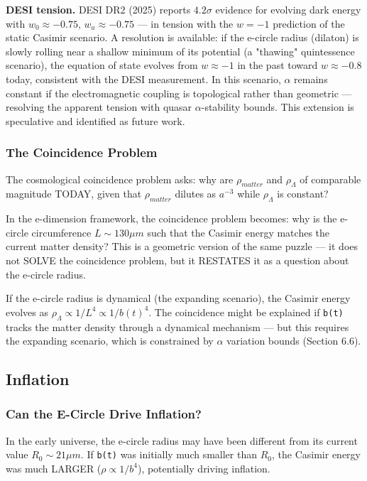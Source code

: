 \documentclass[aps,prd,preprint,superscriptaddress,longbibliography,floatfix]{revtex4-2}
\theoremstyle{remark}
\begin{document}
\textbf{DESI tension.} DESI DR2 (2025) reports $4.2\sigma$ evidence for evolving dark energy with $w_{0} \approx -0.75$, $w_a \approx -0.75$ --- in tension with the $w = -1$ prediction of the static Casimir scenario. A resolution is available: if the e-circle radius (dilaton) is slowly rolling near a shallow minimum of its potential (a "thawing" quintessence scenario), the equation of state evolves from $w \approx -1$ in the past toward $w \approx -0.8$ today, consistent with the DESI measurement. In this scenario, $\alpha$ remains constant if the electromagnetic coupling is topological rather than geometric --- resolving the apparent tension with quasar $\alpha$-stability bounds. This extension is speculative and identified as future work.


\subsubsection{The Coincidence Problem}

The cosmological coincidence problem asks: why are $\rho_{matter}$ and $\rho_\Lambda$ of comparable magnitude TODAY, given that $\rho_{matter}$ dilutes as $a^{-3}$ while $\rho_\Lambda$ is constant?

In the e-dimension framework, the coincidence problem becomes: why is the e-circle circumference $L \sim  130 \mu m$ such that the Casimir energy matches the current matter density? This is a geometric version of the same puzzle --- it does not SOLVE the coincidence problem, but it RESTATES it as a question about the e-circle radius.

If the e-circle radius is dynamical (the expanding scenario), the Casimir energy evolves as $\rho_\Lambda \propto 1/L^{4} \propto 1/b(t)^{4}$. The coincidence might be explained if \texttt{b(t)} tracks the matter density through a dynamical mechanism --- but this requires the expanding scenario, which is constrained by $\alpha$ variation bounds (Section 6.6).



\subsection{Inflation}


\subsubsection{Can the E-Circle Drive Inflation?}

In the early universe, the e-circle radius may have been different from its current value $R_{0} \sim  21 \mu m$. If \texttt{b(t)} was initially much smaller than $R_{0}$, the Casimir energy was much LARGER ($\rho \propto 1/b^{4}$), potentially driving inflation.
\end{document}
